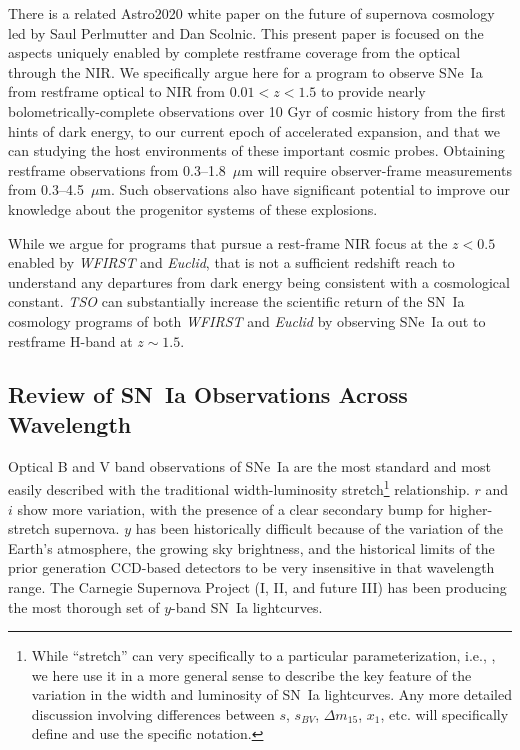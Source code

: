 \documentclass[12pt,preprint]{aastex}
\newcommand{\snia}{SN~Ia\xspace}
\newcommand{\sneia}{SNe~Ia\xspace}
\begin{document}
There is a related Astro2020 white paper on the future of supernova cosmology led by Saul Perlmutter and Dan Scolnic.  This present paper is focused on the aspects uniquely enabled by complete restframe coverage from the optical through the NIR.
We specifically argue here for a program to observe \sneia from restframe optical to NIR from $0.01<z<1.5$ to provide nearly bolometrically-complete observations over 10 Gyr of cosmic history from the first hints of dark energy, to our current epoch of accelerated expansion, and that we can studying the host environments of these important cosmic probes.  Obtaining restframe observations from 0.3--1.8~$\mu$m will require observer-frame measurements from 0.3--4.5~$\mu$m.
  Such observations also have significant potential to improve our knowledge about the progenitor systems of these explosions.

While we argue for programs that pursue a rest-frame NIR focus at the $z<0.5$ enabled by {\it WFIRST} and {\it Euclid}, that is not a sufficient redshift reach to understand any departures from dark energy being consistent with a cosmological constant.  
{\it TSO} can substantially increase the scientific return of the \snia cosmology programs of both {\it WFIRST} and {\it Euclid} by observing \sneia out to restframe H-band at $z\sim1.5$.

\iffalse
\subsection{Review of \snia Observations Across Wavelength}

Optical B and V band observations of \sneia are the most standard and most easily described with the traditional width-luminosity stretch\footnote{While ``stretch'' can very specifically to a particular parameterization, i.e., \citet{Goldhaber01}, we here use it in a more general sense to describe the key feature of the variation in the width and luminosity of \snia lightcurves.  Any more detailed discussion involving differences between $s$, $s_{BV}$, $\Delta m_{15}$, $x_1$, etc. will specifically define and use the specific notation.} relationship.  $r$ and $i$ show more variation, with the presence of a clear secondary bump for higher-stretch supernova.  $y$ has been historically difficult because of the variation of the Earth's atmosphere, the growing sky brightness, and the historical limits of the prior generation CCD-based detectors to be very insensitive in that wavelength range.  The Carnegie Supernova Project (I, II, and future III) has been producing the most thorough set of $y$-band \snia lightcurves.
\end{document}
